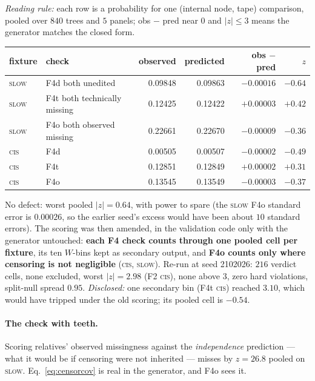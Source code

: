 \begin{center}\small
\emph{Reading rule:} each row is a probability for one (internal node, tape) comparison, pooled over
$840$ trees and $5$ panels; obs $-$ pred near $0$ and $|z|\le3$ means the generator matches the closed
form.\\[3pt]
\begin{tabular}{@{}llrrrr@{}}
\toprule
fixture & check & observed & predicted & obs $-$ pred & $z$ \\
\midrule
\textsc{slow} & F4d both unedited            & 0.09848 & 0.09863 & $-0.00016$ & $-0.64$ \\
\textsc{slow} & F4t both technically missing & 0.12425 & 0.12422 & $+0.00003$ & $+0.42$ \\
\textsc{slow} & F4o both observed missing    & 0.22661 & 0.22670 & $-0.00009$ & $-0.36$ \\
\textsc{cis}  & F4d                          & 0.00505 & 0.00507 & $-0.00002$ & $-0.49$ \\
\textsc{cis}  & F4t                          & 0.12851 & 0.12849 & $+0.00002$ & $+0.31$ \\
\textsc{cis}  & F4o                          & 0.13545 & 0.13549 & $-0.00003$ & $-0.37$ \\
\bottomrule
\end{tabular}
\end{center}
\noindent No defect: worst pooled $|z|=0.64$, with power to spare (the \textsc{slow} F4o standard error
is $0.00026$, so the earlier seed's excess would have been about $10$ standard errors). The scoring
was then amended, in the validation code only with the generator untouched: \textbf{each F4 check
counts through one pooled cell per fixture}, its ten $W$-bins kept as secondary output, and
\textbf{F4o counts only where censoring is not negligible} (\textsc{cis}, \textsc{slow}). Re-run at
seed 2102026: $216$ verdict cells, none excluded, worst $|z|=2.98$ (F2 \textsc{cis}), none above $3$,
zero hard violations, split-null spread $0.95$. \emph{Disclosed:} one secondary bin (F4t
\textsc{cis}) reached $3.10$, which would have tripped under the old scoring; its pooled cell is
$-0.54$.

\paragraph{The check with teeth.} Scoring relatives' observed missingness against the
\emph{independence} prediction --- what it would be if censoring were not inherited --- misses by
$z=26.8$ pooled on \textsc{slow}. Eq.~\eqref{eq:censorcov} is real in the generator, and F4o sees it.

